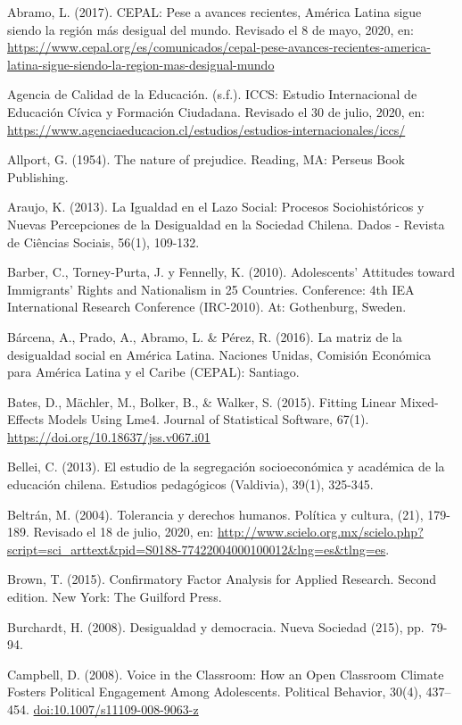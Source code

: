 \documentclass[12pt,twoside]{templates/facsothesis}
\begin{document}
Abramo, L. (2017). CEPAL: Pese a avances recientes, América Latina sigue siendo la región más desigual del mundo. Revisado el 8 de mayo, 2020, en: \url{https://www.cepal.org/es/comunicados/cepal-pese-avances-recientes-america-latina-sigue-siendo-la-region-mas-desigual-mundo}

Agencia de Calidad de la Educación. (s.f.). ICCS: Estudio Internacional de Educación Cívica y Formación Ciudadana. Revisado el 30 de julio, 2020, en: \url{https://www.agenciaeducacion.cl/estudios/estudios-internacionales/iccs/}

Allport, G. (1954). The nature of prejudice. Reading, MA: Perseus Book Publishing.

Araujo, K. (2013). La Igualdad en el Lazo Social: Procesos Sociohistóricos y Nuevas Percepciones de la Desigualdad en la Sociedad Chilena. Dados - Revista de Ciências Sociais, 56(1), 109-132.

Barber, C., Torney-Purta, J. y Fennelly, K. (2010). Adolescents' Attitudes toward Immigrants' Rights and Nationalism in 25 Countries. Conference: 4th IEA International Research Conference (IRC-2010). At: Gothenburg, Sweden.

Bárcena, A., Prado, A., Abramo, L. \& Pérez, R. (2016). La matriz de la desigualdad social en América Latina. Naciones Unidas, Comisión Económica para América Latina y el Caribe (CEPAL): Santiago.

Bates, D., Mächler, M., Bolker, B., \& Walker, S. (2015). Fitting Linear Mixed-Effects Models Using Lme4. Journal of Statistical Software, 67(1). \url{https://doi.org/10.18637/jss.v067.i01}

Bellei, C. (2013). El estudio de la segregación socioeconómica y académica de la educación chilena. Estudios pedagógicos (Valdivia), 39(1), 325-345.

Beltrán, M. (2004). Tolerancia y derechos humanos. Política y cultura, (21), 179-189. Revisado el 18 de julio, 2020, en: \url{http://www.scielo.org.mx/scielo.php?script=sci_arttext\&pid=S0188-77422004000100012\&lng=es\&tlng=es}.

Brown, T. (2015). Confirmatory Factor Analysis for Applied Research. Second edition. New York: The Guilford Press.

Burchardt, H. (2008). Desigualdad y democracia. Nueva Sociedad (215), pp.~79-94.

Campbell, D. (2008). Voice in the Classroom: How an Open Classroom Climate Fosters Political Engagement Among Adolescents. Political Behavior, 30(4), 437-- 454. \url{doi:10.1007/s11109-008-9063-z}
\end{document}
